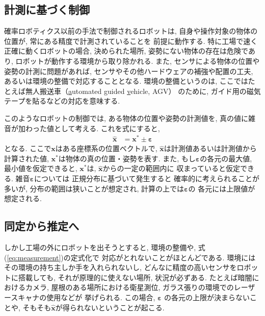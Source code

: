 \documentclass[twocolumn]{jarticle} %
\newcommand{\V}[1]{\boldsymbol{#1}}
\begin{document}
\subsection{計測に基づく制御}

確率ロボティクス以前の手法で制御されるロボットは, 
自身や操作対象の物体の位置が, 
常にある精度で計測されていることを
前提に動作する. 
特に工場で速く正確に動くロボットの場合, 
決められた場所, 姿勢にない物体の存在は危険であり, 
ロボットが動作する環境から取り除かれる. 
また, センサによる物体の位置や姿勢の計測に問題があれば, 
センサやその他ハードウェアの補強や配置の工夫, 
あるいは環境の整備で対応することとなる. 
環境の整備というのは, 
ここではたとえば無人搬送車（\underline{a}utomated \underline{g}uided \underline{v}ehicle, AGV）
のために, ガイド用の磁気テープを貼るなどの対応を意味する. 



このようなロボットの制御では, 
ある物体の位置や姿勢の計測値を, 
真の値に雑音が加わった値として考える. 
これを式にすると, 
\begin{align}
	\hat{\V{x}} &= \V{x}^* \pm \V{\varepsilon} \label{eq:measurement}
\end{align}
となる. 
ここで$\V{x}$はある座標系の位置ベクトルで, 
$\hat{\V{x}}$は計測値あるいは計測値から計算された値, 
$\V{x}^*$は物体の真の位置・姿勢を表す. 
また, もし$\V{\varepsilon}$の各元の最大値, 
最小値を仮定できると, 
$\V{x}^*$は, $\hat{\V{x}}$からの一定の範囲内に
収まっていると仮定できる. 
雑音$\V{\varepsilon}$については
正規分布に基づいて発生すると
確率的に考えられることが多いが, 
分布の範囲は狭いことが想定され, 
計算の上では$\V{\varepsilon}$の
各元には上限値が想定される. 

\subsection{同定から推定へ}

しかし工場の外にロボットを出そうとすると, 
環境の整備や, 式(\ref{eq:measurement})の定式化で
対応がとれないことがほとんどである. 
環境にはその環境の持ち主しか手を入れられないし, 
どんなに精度の高いセンサをロボットに搭載しても, 
それが原理的に使えない場所, 状況が必ずある. 
たとえば暗闇におけるカメラ, 屋根のある場所における衛星測位, 
ガラス張りの環境でのレーザースキャナの使用などが
挙げられる. この場合, $\V{\varepsilon}$
の各元の上限が決まらないことや, 
そもそも$\hat{\V{x}}$が得られないということが起こる. 
\end{document}
